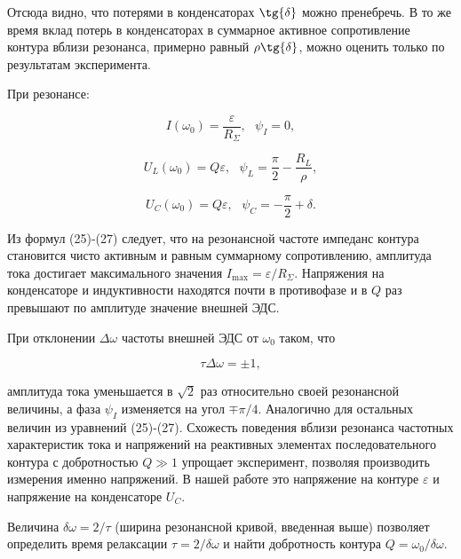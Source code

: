 \documentclass[a4paper,12pt]{article} %
\begin{document}
\hfill \break Отсюда видно, что потерями в конденсаторах $\tg{\delta}$ можно пренебречь. В то же время вклад потерь в конденсаторах в суммарное активное сопротивление контура вблизи резонанса, примерно равный $\rho \tg{\delta}$, можно оценить только по результатам эксперимента. 

\hfill \break При резонансе:

\begin{equation}\label{ linkname }
I(\omega_{0}) = \frac{\varepsilon}{R_{\Sigma}}, \text{ } \psi_{I} = 0,
\end{equation}

\begin{equation}\label{ linkname }
U_{L} (\omega_{0}) = Q\varepsilon, \text{ } \psi_{L} = \frac{\pi}{2} - \frac{R_{L}}{\rho},
\end{equation}

\begin{equation}\label{ linkname }
U_{C} (\omega_{0}) = Q \varepsilon, \text{ } \psi_{C} = -\frac{\pi}{2} + \delta.
\end{equation}

\hfill \break Из формул (25)-(27) следует, что на резонансной частоте импеданс контура становится чисто активным и равным суммарному сопротивлению, амплитуда тока достигает максимального значения $I_\text{max} = \varepsilon/R_{\Sigma}$. Напряжения на конденсаторе и индуктивности находятся почти в противофазе и в $Q$ раз превышают по амплитуде значение внешней ЭДС. 

\hfill \break При отклонении $\Delta \omega$ частоты внешней ЭДС от $\omega_{0}$ таком, что

\begin{equation}\label{ linkname }
\tau \Delta \omega = \pm 1,
\end{equation}

\hfill \break амплитуда тока уменьшается в $\sqrt{2}$ раз относительно своей резонансной величины, а фаза $\psi_{I}$ изменяется на угол $\mp \pi/4$. Аналогично для остальных величин из уравнений (25)-(27). Схожесть поведения вблизи резонанса частотных характеристик тока и напряжений на реактивных элементах последовательного контура с добротностью $Q \gg 1$ упрощает эксперимент, позволяя производить измерения именно напряжений. В нашей работе это напряжение на контуре $\varepsilon$ и напряжение на конденсаторе $U_{C}$.

\hfill \break Величина $\delta \omega = 2/\tau$ (ширина резонансной кривой, введенная выше) позволяет определить время релаксации $\tau = 2/\delta \omega$ и найти добротность контура $Q = \omega_{0}/\delta \omega$. 
\end{document}
